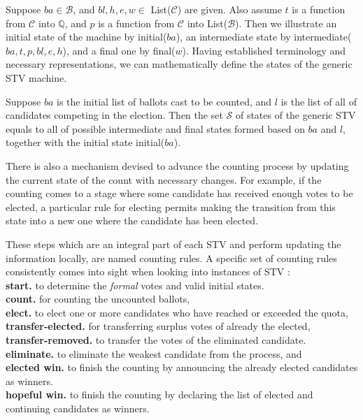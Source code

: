 \documentclass{llncs}
\begin{document}
Suppose $ba \in\mathcal{B}$, and $bl , h, e, w \in$ \textsf{List}($\mathcal{C}$) are given. Also assume $t$ is a function from $\mathcal{C}$ into $\mathbb{Q}$, and $p$ is a function from $\mathcal{C}$ into \textsf{List}($\mathcal{B}$). Then we illustrate an initial state of the machine by \textsf{initial}($ba$), an intermediate state by \textsf{intermediate}($ba, t, p, bl, e, h$), and a final one by \textsf{final}($w$). Having established terminology and necessary representations, we can mathematically define the states of the generic STV machine. 
\begin{definition}\label{stv:states}
Suppose $ba$ is the initial list of ballots cast to be counted, and $l$ is the list of all of candidates competing in the election. Then the set $\mathcal{S}$ of states of the generic STV equals to all of possible intermediate and final states formed based on $ba$ and $l$, together with the initial state \textsf{initial}($ba$).
\end{definition}
There is also a mechanism devised to advance the counting process by updating the current state of the count with necessary changes. For example, if the counting comes to a stage where some candidate has received enough votes to be elected, a particular rule for electing permits making the transition from this state into a new one where the candidate has been elected. 


These steps which are an integral part of each STV and perform updating the information locally, are named counting rules. A specific set of counting rules consistently comes into sight when looking into instances of STV :
\\
\noindent\textbf{start.} to determine the \emph{formal} votes and valid initial states.\\
\noindent\textbf{count.} for counting the uncounted ballots,\\
\noindent\textbf{elect.} to elect one or more candidates who have reached or exceeded the quota,\\ 
\noindent\textbf{transfer-elected.} for transferring surplus votes of already the elected, \\
\noindent\textbf{transfer-removed.} to transfer the votes of the eliminated candidate.\\
\noindent\textbf{eliminate.} to eliminate the weakest candidate from the process, and\\ 
\noindent\textbf{elected win.} to finish the counting by announcing the  already elected candidates as winners. \\
\noindent\textbf{hopeful win.} to finish the counting by declaring the list of elected and continuing candidates as winners.\\
\end{document}
